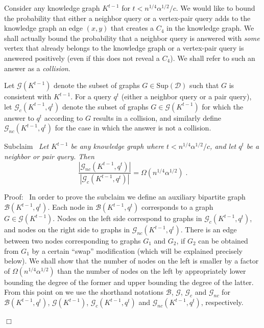 \documentclass{article}
\newcommand{\calB}{{\mathcal{B}}}
\newcommand{\calD}{{\mathcal{D}}}
\newcommand{\calG}{{\mathcal{G}}}
\newcommand{\Sup}{\textrm{Sup}}
\newenvironment{proof}{\smallskip\noindent{\bf Proof:}}%
        {\hspace*{\fill}$\Box$\par}
\newcommand{\commentt}[1]{ {}}
\begin{document}
\begin{proof}
Consider any knowledge graph $K^{t-1}$ for $t < n^{1/4}\alpha^{1/2}/c$.
We would like to bound the probability that either a neighbor query or a vertex-pair query adds to the knowledge graph an edge $(x,y)$ that creates a $C_4$ in the knowledge graph. We shall actually bound the probability that a neighbor query is answered with \emph{some} vertex that already belongs to the knowledge graph or a vertex-pair query is answered positively (even if this does not reveal a $C_4$).
We shall refer to such an answer as a \emph{collision}. %

Let $\calG(K^{t-1})$ denote the subset of graphs  $G\in \Sup(\calD)$ such that %
$G$ is consistent with $K^{t-1}$. For a query $q^t$ (either a neighbor query or a pair query), let $\calG_c(K^{t-1},q^t)$ denote the subset of graphs  $G\in \calG(K^{t-1})$ for which the answer to $q^t$ according to %
$G$ results in a collision, and similarly define $\calG_{nc}(K^{t-1},q^t)$ for the case in which the answer is not a collision. %

\smallskip\noindent
\textsf{Subclaim}~
\emph{
Let $K^{t-1}$ be any knowledge graph where $t < n^{1/4}\alpha^{1/2}/c$, and let $q^t$ be a neighbor or pair query.
Then
$$ \frac{|\calG_{nc}(K^{t-1},q^t)|}{|\calG_{c}(K^{t-1},q^t)|} = \Omega(n^{1/4}\alpha^{1/2}) \;.$$
}

\smallskip
\noindent
\textsf{Proof:}~
In order to prove the subclaim we define an auxiliary bipartite graph $\calB(K^{t-1},q^t)$. Each node in $\calB(K^{t-1},q^t)$ corresponds to a graph $G \in \calG(K^{t-1})$.
Nodes on the left side correspond to graphs in $\calG_{c}(K^{t-1},q^t)$, and nodes on the right side to graphs in $\calG_{nc}(K^{t-1},q^t)$.
 There is an edge between two nodes corresponding to graphs $G_1$ and $G_2$, if $G_2$ can be obtained from $G_1$ by a certain ``swap'' modification (which will be explained precisely below). We shall show that the number of nodes on the left is smaller by a factor of $\Omega(n^{1/4}\alpha^{1/2})$ than the number of nodes on the left by appropriately lower bounding the degree of the former and upper bounding the degree of the latter.
 From this point on we use the shorthand notations $\calB$, $\calG$, $\calG_c$ and $\calG_{nc}$ for $\calB(K^{t-1},q^t)$, $\calG(K^{t-1})$, $\calG_c(K^{t-1},q^t)$ and $\calG_{nc}(K^{t-1},q^t)$, respectively.


\end{proof}
\end{document}

